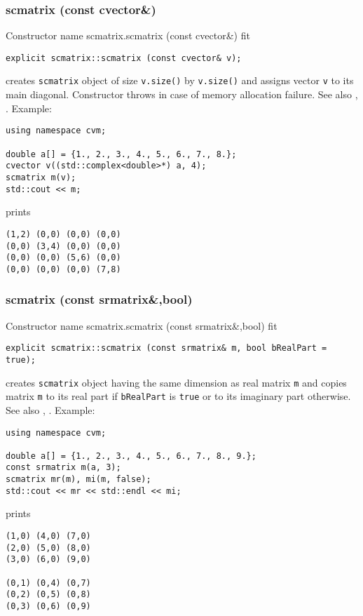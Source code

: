 \subsubsection{scmatrix (const cvector\&)}
Constructor%
\pdfdest name {scmatrix.scmatrix (const cvector&)} fit
\begin{verbatim}
explicit scmatrix::scmatrix (const cvector& v);
\end{verbatim}
creates  \verb"scmatrix" object
of size \verb"v.size()" by \verb"v.size()"
and assigns vector \verb"v" to its main diagonal.
Constructor throws  
in case of memory allocation failure.
See also , .
Example:
\begin{Verbatim}
using namespace cvm;

double a[] = {1., 2., 3., 4., 5., 6., 7., 8.};
cvector v((std::complex<double>*) a, 4);
scmatrix m(v);
std::cout << m;
\end{Verbatim}
prints
\begin{Verbatim}
(1,2) (0,0) (0,0) (0,0)
(0,0) (3,4) (0,0) (0,0)
(0,0) (0,0) (5,6) (0,0)
(0,0) (0,0) (0,0) (7,8)
\end{Verbatim}
\newpage



\subsubsection{scmatrix (const srmatrix\&,bool)}
Constructor%
\pdfdest name {scmatrix.scmatrix (const srmatrix&,bool)} fit
\begin{verbatim}
explicit scmatrix::scmatrix (const srmatrix& m, bool bRealPart = true);
\end{verbatim}
creates  \verb"scmatrix" object
having the same dimension as real matrix \verb"m"
and copies  matrix \verb"m" to its real part if
\verb"bRealPart" is \verb"true" or
to its imaginary part otherwise.
See also , .
Example:
\begin{Verbatim}
using namespace cvm;

double a[] = {1., 2., 3., 4., 5., 6., 7., 8., 9.};
const srmatrix m(a, 3);
scmatrix mr(m), mi(m, false);
std::cout << mr << std::endl << mi;
\end{Verbatim}
prints
\begin{Verbatim}
(1,0) (4,0) (7,0)
(2,0) (5,0) (8,0)
(3,0) (6,0) (9,0)

(0,1) (0,4) (0,7)
(0,2) (0,5) (0,8)
(0,3) (0,6) (0,9)
\end{Verbatim}
\newpage




